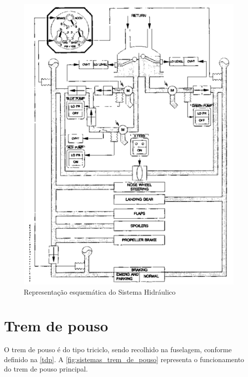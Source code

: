 \begin{figure}
\centering
\includegraphics[width=\textwidth]{images/parte3/sistemas_hidraulico.png}
\caption{Representação esquemática do Sistema Hidráulico}
\label{fig:sistemas_hidraulico}
\end{figure}


\section{Trem de pouso}

O trem de pouso é do tipo triciclo, sendo recolhido na fuselagem, conforme definido na \autoref{tdp}.
A \autoref{fig:sistemas_trem_de_pouso} representa o funcionamento do trem de pouso principal.

